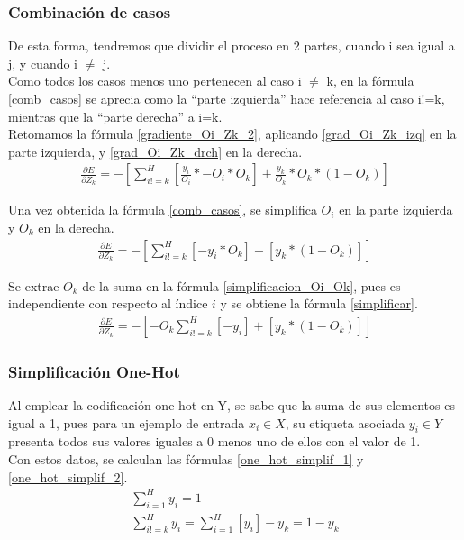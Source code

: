 \subsubsection{Combinación de casos}

De esta forma, tendremos que dividir  el proceso en 2 partes, cuando i sea igual a j, y cuando i $\neq$ j. \\
Como todos los casos menos uno pertenecen al caso i $\neq$ k, en la fórmula \ref{comb_casos} se aprecia como la ``parte izquierda'' hace referencia al caso i!=k, mientras que la ``parte derecha'' a i=k. \\
Retomamos la fórmula \ref{gradiente_Oi_Zk_2}, aplicando \ref{grad_Oi_Zk_izq} en la parte izquierda, y \ref{grad_Oi_Zk_drch} en la derecha. \\
\begin{gather}
	\frac{\partial E}{\partial Z_k} = - [\sum_{i!=k}^{H} [\frac{y_i}{O_i} * -O_i * O_k ] + \frac{y_k}{O_k} * O_k * (1 - O_k)  ]
	\label{comb_casos}
\end{gather}

Una vez obtenida la fórmula \ref{comb_casos}, se simplifica $O_i$ en la parte izquierda y $O_k$ en la derecha. \\
\begin{gather}
	\frac{\partial E}{\partial Z_k} = - [\sum_{i!=k}^{H} [- y_i * O_k] + [y_k * (1 - O_k) ] ] 
	\label{simplificacion_Oi_Ok}
\end{gather}

Se extrae $O_k$ de la suma en la fórmula \ref{simplificacion_Oi_Ok}, pues es independiente con respecto al índice $i$ y se obtiene la fórmula \ref{simplificar}.\\
\begin{gather}	
	\frac{\partial E}{\partial Z_k} = - [-O_k \sum_{i!=k}^{H}[-y_i] + [y_k * (1 - O_k) ] ]
	\label{simplificar}
\end{gather}

\subsubsection{Simplificación One-Hot}

Al emplear la codificación one-hot en Y, se sabe que la suma de sus elementos es igual a 1, pues para un ejemplo de entrada $x_i \in X$, su etiqueta asociada $y_i \in Y$ presenta todos sus valores iguales a 0 menos uno de ellos con el valor de 1. \\
Con estos datos, se calculan las fórmulas \ref{one_hot_simplif_1} y \ref{one_hot_simplif_2}.
\begin{gather}
	\sum_{i=1}^{H} y_i = 1 \label{one_hot_simplif_1}\\
	\sum_{i!=k}^{H} y_i = \sum_{i=1}^{H} [y_i] - y_k = 1 - y_k
	\label{one_hot_simplif_2}
\end{gather}

